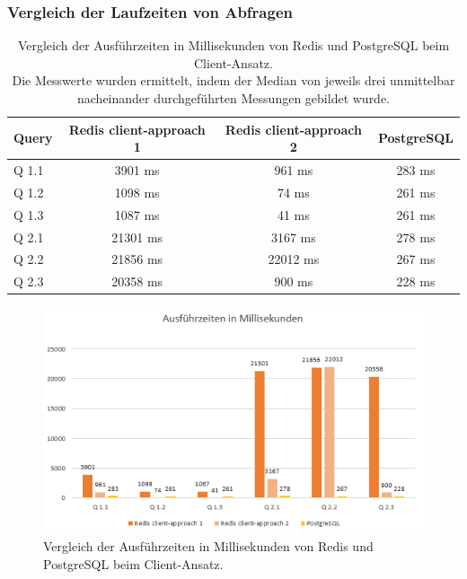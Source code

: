 \subsubsection{Vergleich der Laufzeiten von Abfragen}
\begin{table}[h]
\centering
\begin{tabular}{lccc}
\hline
Query & Redis client-approach 1 & Redis client-approach 2 & PostgreSQL \\ \hline
Q 1.1 & 3901 ms & 961 ms & 283 ms       \\
Q 1.2 & 1098 ms & 74 ms & 261 ms       \\
Q 1.3 & 1087 ms & 41 ms & 261 ms       \\
Q 2.1 & 21301 ms & 3167 ms & 278 ms       \\
Q 2.2 & 21856 ms & 22012 ms & 267 ms       \\
Q 2.3 & 20358 ms & 900 ms & 228 ms       \\\hline
\end{tabular}
\caption{Vergleich der Ausführzeiten in Millisekunden von Redis und PostgreSQL beim Client-Ansatz.\\
 Die Messwerte wurden ermittelt, indem der Median von jeweils drei unmittelbar nacheinander durchgeführten Messungen gebildet wurde.}
\label{tab:results-client}
\end{table}
\begin{figure}[ht]  %
    \centering      %
    \includegraphics[width=1\textwidth]{pictures/results/results-client.png}
    \caption{Vergleich der Ausführzeiten in Millisekunden von Redis und PostgreSQL beim Client-Ansatz.}      %
    \label{pic:results-client}    %
\end{figure}


